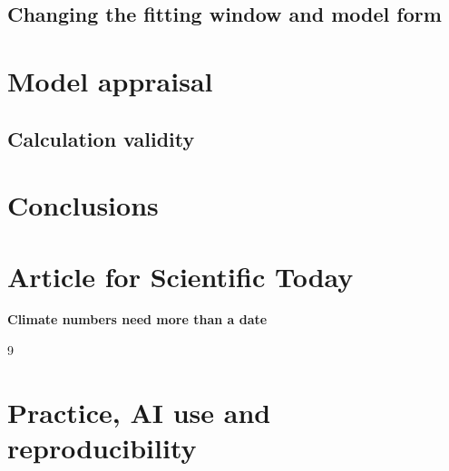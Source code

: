 \subsection{Changing the fitting window and model form}
\begin{table}[H]\centering\small
\caption{                                                      }\label{tab:window}
\end{table}
\section{Model appraisal}\label{sec:appraisal}
\subsection{Calculation validity}
\section{Conclusions}\label{sec:conclusion}
\clearpage
\section{Article for Scientific Today}\label{sec:article}
\begin{center}{\large\bfseries Climate numbers need more than a date}\end{center}
\clearpage
{}
\begin{thebibliography}{9}
\end{thebibliography}
\section*{Practice, AI use and reproducibility}

